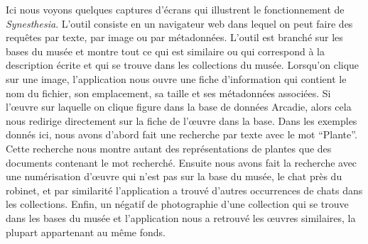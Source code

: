 Ici nous voyons quelques captures d'écrans qui illustrent le fonctionnement de \textit{Synesthesia}. L'outil consiste en un navigateur web dans lequel on peut faire des requêtes par texte, par image ou par métadonnées. L'outil est branché sur les bases du musée et montre tout ce qui est similaire ou qui correspond à la description écrite et qui se trouve dans les collections du musée. Lorsqu'on clique sur une image, l'application nous ouvre une fiche d'information qui contient le nom du fichier, son emplacement, sa taille et ses métadonnées associées. Si l’œuvre sur laquelle on clique figure dans la base de données Arcadie, alors cela nous redirige directement sur la fiche de l’œuvre dans la base. Dans les exemples donnés ici, nous avons d'abord fait une recherche par texte avec le mot \enquote{Plante}. Cette recherche nous montre autant des représentations de plantes que des documents contenant le mot recherché. Ensuite nous avons fait la recherche avec une numérisation d’œuvre qui n'est pas sur la base du musée, le chat près du robinet, et par similarité l'application a trouvé d'autres occurrences de chats dans les collections. Enfin, un négatif de photographie d'une collection qui se trouve dans les bases du musée et l'application nous a retrouvé les œuvres similaires, la plupart appartenant au même fonds.


